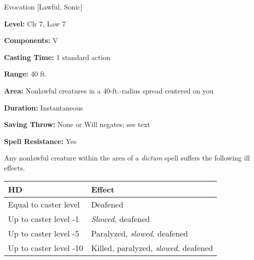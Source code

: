 
Evocation [Lawful, Sonic]

\textbf{Level:} Clr 7, Law 7

\textbf{Components:} V

\textbf{Casting Time:} 1 standard action

\textbf{Range:} 40 ft.

\textbf{Area:} Nonlawful creatures in a 40-ft.-radius spread centered on you

\textbf{Duration:} Instantaneous

\textbf{Saving Throw:} None or Will negates; see text

\textbf{Spell Resistance:} Yes

Any nonlawful creature within the area of a \textit{dictum} spell suffers the following 
ill effects.

\begin{longtable}{llll}
\hline
\multicolumn{1}{|p{1.369in}|}{\begin{minipage}[t]{1.369in}\raggedright
\textbf{HD}\end{minipage}} & \multicolumn{1}{p{2.133in}|}{\begin{minipage}[t]{2.133in}\raggedright
\textbf{Effect}\end{minipage}}\\
\hline
\multicolumn{1}{p{0.069in}|}{\begin{minipage}[t]{0.069in}\raggedright
Equal to caster level\end{minipage}} & \multicolumn{1}{p{0.069in}|}{\begin{minipage}[t]{0.069in}\raggedright
Deafened\end{minipage}}\\
\hline
\multicolumn{1}{|p{1.369in}|}{\begin{minipage}[t]{1.369in}\raggedright
Up to caster level -1\end{minipage}} & \multicolumn{1}{p{2.133in}|}{\begin{minipage}[t]{2.133in}\raggedright
\textit{Slowed}, deafened\end{minipage}}\\
\hline
\multicolumn{1}{p{0.069in}|}{\begin{minipage}[t]{0.069in}\raggedright
Up to caster level -5\end{minipage}} & \multicolumn{1}{p{0.069in}|}{\begin{minipage}[t]{0.069in}\raggedright
Paralyzed, \textit{slowed}, deafened\end{minipage}}\\
\hline
\multicolumn{1}{|p{1.369in}|}{\begin{minipage}[t]{1.369in}\raggedright
Up to caster level -10\end{minipage}} & \multicolumn{3}{p{2.272in}|}{\begin{minipage}[t]{2.272in}\raggedright
Killed, paralyzed, \textit{slowed}, deafened\end{minipage}}\\
\hline
\end{longtable}

